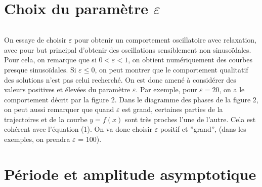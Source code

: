 \documentclass{article}
\begin{document}
\newpage
\section{Choix du paramètre $\varepsilon$}

\[\]

On essaye de choisir $\varepsilon$ pour obtenir un comportement oscillatoire avec relaxation, avec pour
but principal d’obtenir des oscillations sensiblement non sinusoïdales. Pour cela, on remarque
que si $0 <\varepsilon < 1$, on obtient numériquement des courbes presque sinusoïdales. Si
$\varepsilon \leq 0$, on peut
montrer que le comportement qualitatif des solutions n’est pas celui recherché.
On est donc amené à considérer des valeurs positives et élevées du paramètre $\varepsilon$. 
Par exemple, pour $\varepsilon = 20$, on a le comportement décrit par la figure 2.
Dans le diagramme des phases de la figure 2, on peut aussi remarquer que quand $\varepsilon$ est grand,
certaines parties de la trajectoires et de la courbe $y = f (x)$ sont très proches l’une de l’autre.
Cela est cohérent avec l’équation (1). On va donc choisir $\varepsilon$ positif et ”grand”, (dans les exemples, on prendra
$\varepsilon$ = 100).

\section{Période et amplitude asymptotique}
\end{document}
